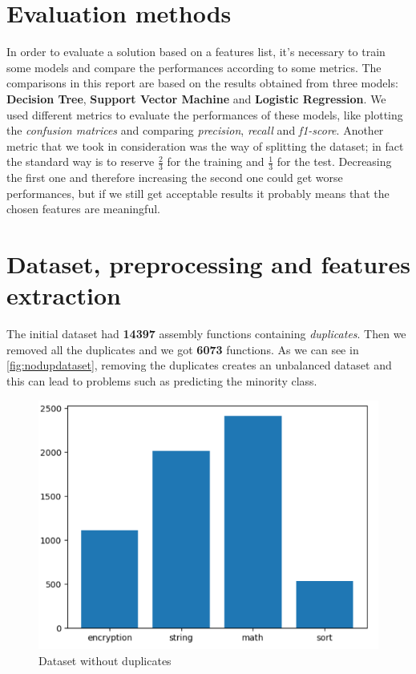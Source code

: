 \documentclass[11pt]{article}
\begin{document}
\section{Evaluation methods}
In order to evaluate a solution based on a features list, it's necessary to train some models and compare the performances according to some metrics. The comparisons in this report are based on the results obtained from three models: \textbf{Decision Tree}, \textbf{Support Vector Machine} and \textbf{Logistic Regression}. We used different metrics to evaluate the performances of these models, like plotting the \textit{confusion matrices} and comparing \textit{precision}, \textit{recall} and \textit{f1-score}. Another metric that we took in consideration was the way of splitting the dataset; in fact the standard way is to reserve $\frac{2}{3}$ for the training and $\frac{1}{3}$ for the test. Decreasing the first one and therefore increasing the second one could get worse performances, but if we still get acceptable results it probably means that the chosen features are meaningful.

\section{Dataset, preprocessing and features extraction}
The initial dataset had \textbf{14397} assembly functions containing \textit{duplicates}. Then we removed all the duplicates and we got \textbf{6073} functions. As we can see in \autoref{fig:nodupdataset}, removing the duplicates creates an unbalanced dataset and this can lead to problems such as predicting the minority class.

\begin{figure}[H]
\centering
\includegraphics[scale=0.4]{images/dataset_without_dup.png}
\caption{Dataset without duplicates}
\label{fig:nodupdataset}
\end{figure}
\end{document}

